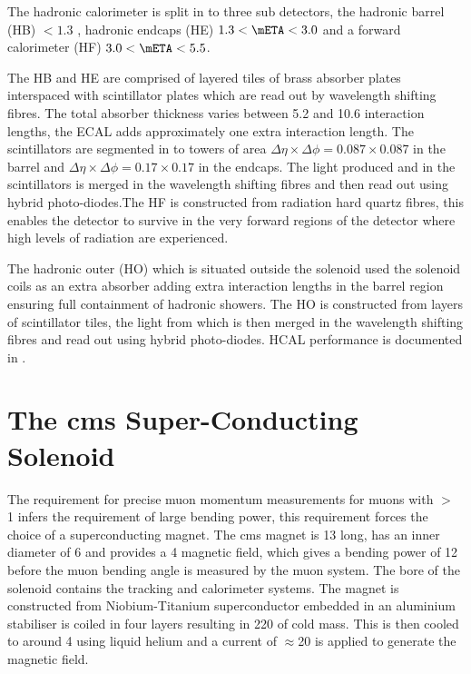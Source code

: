 The hadronic calorimeter is split in to three sub detectors, the hadronic 
barrel (HB) \mETA $< 1.3$ , hadronic endcaps (HE) $1.3 < \mETA < 3.0$ and a 
forward calorimeter (HF) $3.0 < \mETA < 5.5$.

The HB and HE are comprised of layered tiles of brass absorber plates 
interspaced with scintillator plates which are read out by wavelength shifting 
fibres. The total absorber thickness varies between 5.2 and 10.6 interaction 
lengths, the ECAL adds approximately one extra interaction length. The 
scintillators are segmented in to towers of area $\Delta\eta\times\Delta\phi = 
0.087\times0.087$ in the barrel and $\Delta\eta\times\Delta\phi = 
0.17\times0.17$ in the endcaps. The light produced and in the scintillators is 
merged in the wavelength shifting fibres and then read out using hybrid 
photo-diodes.The HF is constructed from radiation hard quartz fibres, this 
enables the detector to survive in the very forward regions of the detector 
where high levels of radiation are experienced.

The hadronic outer (HO) which is situated outside the solenoid used the 
solenoid coils as an extra absorber adding extra interaction lengths in the 
barrel region ensuring full containment of hadronic showers. The HO is 
constructed from layers of scintillator tiles, the light from which is then merged in the wavelength shifting fibres and read out using hybrid photo-diodes.
HCAL performance is documented in \cite{CMS-DP-2010-025}.


\section{The \ac{cms} Super-Conducting Solenoid} %
\label{sec:the_cms_super_conducting_solenoid}
The requirement for precise muon momentum measurements for muons with \PT $>$ 
\unit{1}{\TeV} infers the requirement of large bending power, this requirement 
forces the choice of a superconducting magnet. The \ac{cms} magnet is 
\unit{13}{\meter} long, has an inner diameter of \unit{6}{\meter} and provides 
a \unit{4}{\tesla} magnetic field, which gives a bending power of 
\unit{12}{\tesla\meter} before the muon bending angle is measured by the muon 
system. The bore of the solenoid contains the tracking and calorimeter systems.
The magnet is constructed from Niobium-Titanium superconductor embedded in an 
aluminium stabiliser is coiled in four layers resulting in \unit{220}{\ton} of 
cold mass. This is then cooled to around \unit{4}{\kelvin} using liquid helium 
and a current of $\approx$\unit{20}{\kilo\ampere} is applied to generate the 
magnetic field.

